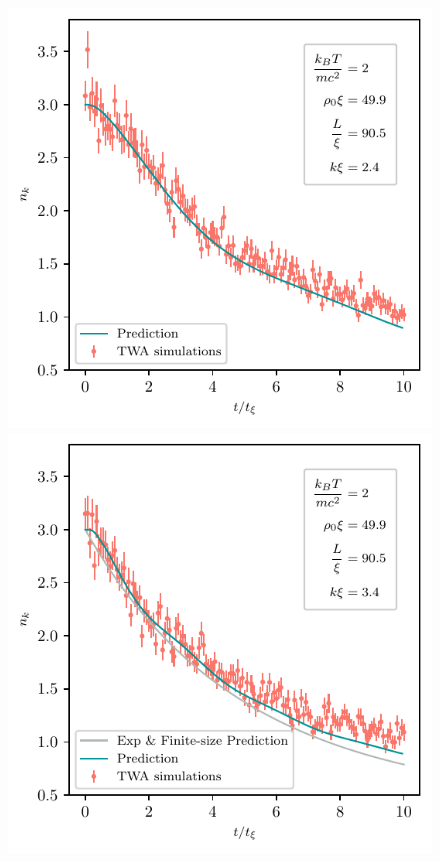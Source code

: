 \documentclass[aps,prd,notitlepage,amsfonts,amssymb,amsmath,nofootinbib,superscriptaddress,longbibliography]{revtex4-2}
\begin{document}
\begin{appendices}
\begin{figure}
\begin{minipage}{0.45\textwidth}
    \end{minipage}

     \begin{minipage}{0.45\textwidth}
        \centering
        \includegraphics[width=\textwidth]{fig9c.pdf}
    \end{minipage} \hfill
          \begin{minipage}{0.45\textwidth}
        \centering
         \includegraphics[width=\textwidth]{fig9d.pdf}
    \end{minipage}



\end{figure}
\end{appendices}
\end{document}

